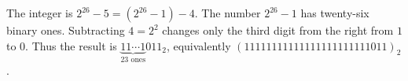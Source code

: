 The integer is $2^{26}-5=(2^{26}-1)-4$. The number $2^{26}-1$ has twenty-six binary ones. Subtracting $4=2^2$ changes only the third digit from the right from $1$ to $0$. Thus the result is $\boxed{\underbrace{11\cdots1}_{23\text{ ones}}011_2}$, equivalently $\boxed{(11111111111111111111111011)_2}$.
